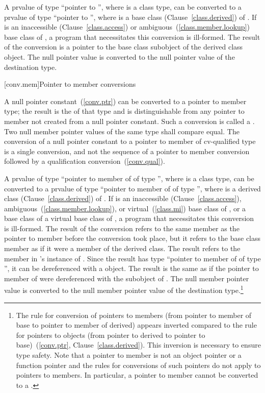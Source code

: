 \pnum
A prvalue of type ``pointer to  '', where 
is a class type, can be converted to a prvalue of type ``pointer to
 '', where  is a base class
(Clause~\ref{class.derived}) of . If  is an
inaccessible (Clause~\ref{class.access}) or
ambiguous~(\ref{class.member.lookup}) base class of , a program
that necessitates this conversion is ill-formed. The result of the
conversion is a pointer to the base class subobject of the derived class
object. The null pointer value is converted to the null pointer value of
the destination type.

[conv.mem]{Pointer to member conversions}

\pnum
{}%
%
%
A null pointer constant~(\ref{conv.ptr}) can be converted to a pointer
to member type; the result is the 
of that type and is distinguishable from any pointer to member not
created from a null pointer constant.
Such a conversion is called a .
Two null member pointer values of
the same type shall compare equal. The conversion of a null pointer
constant to a pointer to member of cv-qualified type is a single
conversion, and not the sequence of a pointer to member conversion
followed by a qualification conversion~(\ref{conv.qual}).

\pnum
A prvalue of type ``pointer to member of  of type 
'', where  is a class type, can be converted to
a prvalue of type ``pointer to member of  of type 
'', where  is a derived class
(Clause~\ref{class.derived}) of . If  is an
inaccessible (Clause~\ref{class.access}),
ambiguous~(\ref{class.member.lookup}), or virtual~(\ref{class.mi}) base
class of , or a base class of a virtual base class of
, a program that necessitates this conversion is ill-formed.
The result of the conversion refers to the same member as the pointer to
member before the conversion took place, but it refers to the base class
member as if it were a member of the derived class. The result refers to
the member in 's instance of . Since the result has
type ``pointer to member of  of type  '',
it can be dereferenced with a  object. The result is the same
as if the pointer to member of  were dereferenced with the
 subobject of . The null member pointer value is
converted to the null member pointer value of the destination
type.\footnote{The rule for conversion of pointers to members (from pointer to member
of base to pointer to member of derived) appears inverted compared to
the rule for pointers to objects (from pointer to derived to pointer to
base)~(\ref{conv.ptr}, Clause~\ref{class.derived}). This inversion is
necessary to ensure type safety. Note that a pointer to member is not
an object pointer or a function pointer
and the rules for conversions
of such pointers do not apply to pointers to members.
%
In particular, a pointer to member cannot be converted to a
.}

